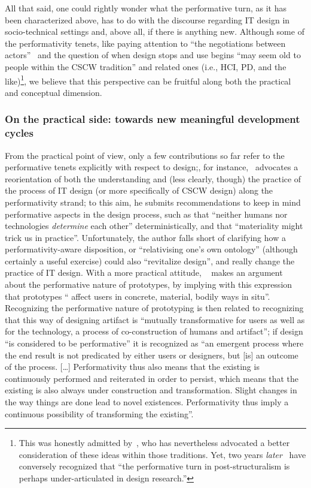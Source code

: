 \documentclass{article}
\begin{document}
All that said, one could rightly wonder what the performative turn, as it has been characterized above, has to do with the discourse regarding IT design in socio-technical settings and, above all, if there is anything new. Although some of the performativity tenets, like paying attention to ``the negotiations between actors''~\citep[p. 67]{wagner_exploring_2010} and the question of when design stops and use begins\citep[cf. e.g., ][]{brand_how_1995} ``may seem old to people within the CSCW tradition'' and related ones (i.e., HCI, PD, and the like)\footnote{This was honestly admitted by~\citet{jensen_cscw_2008}, who has nevertheless advocated a better consideration of these ideas within those traditions. Yet, two years \emph{later}~\citet[p. 31]{bratteteig_research_2010} have conversely recognized that ``the performative turn in post-structuralism is perhaps under-articulated in design research.''}, we believe that this perspective can be fruitful along both the practical and conceptual dimension.

\subsubsection{On the practical side: towards new meaningful development cycles}

From the practical point of view, only a few contributions so far refer to the performative tenets explicitly with respect to design;, for instance,~\citet{jensen_cscw_2008} advocates a reorientation of both the understanding and (less clearly, though) the practice of the process of IT design (or more specifically of CSCW design) along the performativity strand; to this aim, he submits recommendations to keep in mind performative aspects in the design process, such as that ``neither humans nor technologies \emph{determine} each other'' deterministically, and that ``materiality might trick us in practice''. Unfortunately, the author falls short of clarifying how a performativity-aware disposition, or ``relativising one's own ontology'' (although certainly a useful exercise) could also ``revitalize design'', and really change the practice of IT design. With a more practical attitude, ~\citet{danholt_prototypes_2005} makes an argument about the performative nature of prototypes, by implying with this expression that prototypes `` affect users in concrete, material, bodily ways in situ''.  Recognizing the performative nature of prototyping is then related to recognizing that this way of designing artifact is ``mutually transformative for users as well as for the technology, a process of co-construction of humans and artifact''; if design ``is considered to be performative'' it is recognized as ``an emergent process where the end result is not predicated by either users or designers, but [is] an outcome of the process. [\ldots] Performativity thus also means that the existing is continuously performed and reiterated in order to persist, which means that the existing is also always under construction and transformation. Slight changes in the way things are done lead to novel existences. Performativity thus imply a continuous possibility of transforming the existing''. 
\end{document}
